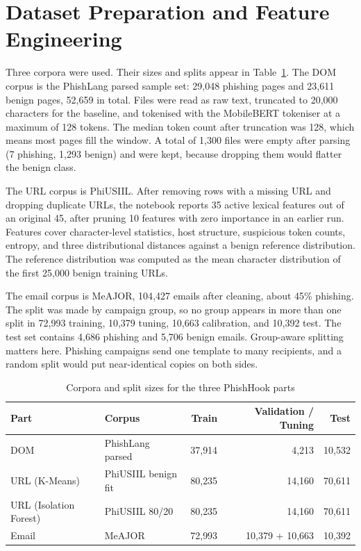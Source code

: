 \documentclass{FastFyp}
\begin{document}
\section{Dataset Preparation and Feature Engineering}
\label{sec:datasets}

Three corpora were used. Their sizes and splits appear in Table~\ref{tab:datasets}. The DOM corpus is the PhishLang parsed sample set: 29{,}048 phishing pages and 23{,}611 benign pages, 52{,}659 in total. Files were read as raw text, truncated to 20{,}000 characters for the baseline, and tokenised with the MobileBERT tokeniser at a maximum of 128 tokens. The median token count after truncation was 128, which means most pages fill the window. A total of 1{,}300 files were empty after parsing (7 phishing, 1{,}293 benign) and were kept, because dropping them would flatter the benign class.

The URL corpus is PhiUSIIL. After removing rows with a missing URL and dropping duplicate URLs, the notebook reports 35 active lexical features out of an original 45, after pruning 10 features with zero importance in an earlier run. Features cover character-level statistics, host structure, suspicious token counts, entropy, and three distributional distances against a benign reference distribution. The reference distribution was computed as the mean character distribution of the first 25{,}000 benign training URLs.

The email corpus is MeAJOR, 104{,}427 emails after cleaning, about 45\% phishing. The split was made by campaign group, so no group appears in more than one split in 72{,}993 training, 10{,}379 tuning, 10{,}663 calibration, and 10{,}392 test. The test set contains 4{,}686 phishing and 5{,}706 benign emails. Group-aware splitting matters here. Phishing campaigns send one template to many recipients, and a random split would put near-identical copies on both sides.

\begin{table}[htbp]
\centering
\caption{Corpora and split sizes for the three PhishHook parts}
\label{tab:datasets}
\begin{tabular}{llrrr}
\hline
Part & Corpus & Train & Validation / Tuning & Test \\
\hline
DOM & PhishLang parsed & 37{,}914 & 4{,}213 & 10{,}532 \\
URL (K-Means) & PhiUSIIL benign fit & 80{,}235 & 14{,}160 & 70{,}611 \\
URL (Isolation Forest) & PhiUSIIL 80/20 & 80{,}235 & 14{,}160 & 70{,}611 \\
Email & MeAJOR & 72{,}993 & 10{,}379 + 10{,}663 & 10{,}392 \\
\hline
\end{tabular}
\end{table}
\end{document}
